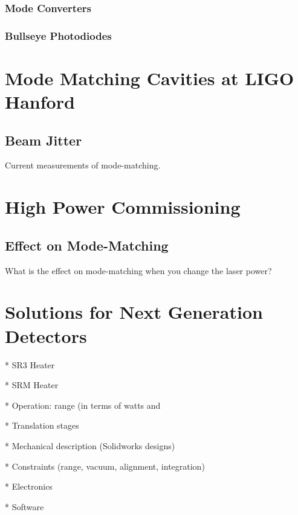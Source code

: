\documentclass[10pt,a4paper]{book}
\begin{document}
\begin{linenumbers}
		\subsection{Mode Converters}
		
		\subsection{Bullseye Photodiodes}

\chapter{Mode Matching Cavities at LIGO Hanford}
	\section{Beam Jitter}
	
Current measurements of mode-matching.

\chapter{High Power Commissioning}
	\section{Effect on Mode-Matching}
	What is the effect on mode-matching when you change the laser power?

\chapter{Solutions for Next Generation Detectors}

* SR3 Heater

* SRM Heater

* Operation: range (in terms of watts and %


* Translation stages

* Mechanical description (Solidworks designs)

* Constraints (range, vacuum, alignment, integration)

* Electronics 

* Software
	\listoffigures
	\listoftables

\end{linenumbers}
\end{document}
